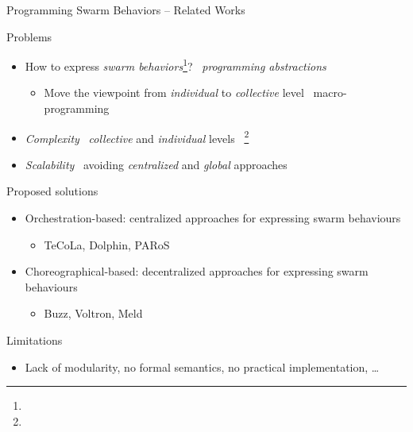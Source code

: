 \documentclass[presentation, 9pt]{beamer}\mode<presentation>{\usetheme{AMSBolognaFC}}
\begin{document}
\begin{frame}{Programming Swarm Behaviors -- Related Works}
	\begin{block}{Problems}
		\begin{itemize}
			\item How to express \emph{swarm behaviors}\footnote{}? \faArrowRight \, \emph{programming abstractions} 
			\begin{itemize}
				\item Move the viewpoint from \emph{individual} to \emph{collective} level \faArrowRight \, macro-programming 
			\end{itemize}
			\item \emph{Complexity} \faArrowRight \, \emph{collective} and \emph{individual} levels \faArrowRight \, \footnote{}
			\item \emph{Scalability} \faArrowRight \, avoiding \emph{centralized} and \emph{global} approaches
		\end{itemize}
	\end{block}
	\begin{alertblock}{Proposed solutions}
		\begin{itemize}
			\item Orchestration-based: centralized approaches for expressing swarm behaviours
			\begin{itemize}
				\item TeCoLa, Dolphin, PARoS
			\end{itemize}
			\item Choreographical-based: decentralized approaches for expressing swarm behaviours
			\begin{itemize}
				\item Buzz, Voltron, Meld
			\end{itemize}
		\end{itemize}
	\end{alertblock}
	\begin{block}{Limitations}
		\begin{itemize}
			\item Lack of modularity, no formal semantics, no practical implementation, \dots
		\end{itemize}
	\end{block}
\end{frame}
\end{document}
